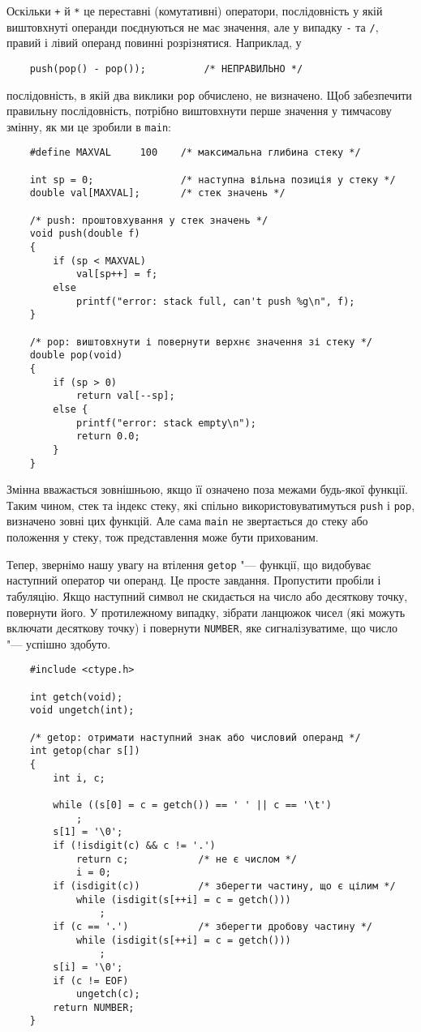\documentclass[a4paper,12pt]{book}
\begin{document}
  Оскільки \texttt{+} й \texttt{*} це переставні (комутативні) оператори, послідовність у
  якій виштовхнуті операнди поєднуються не має значення, але у випадку \texttt{-} та
  \texttt{/}, правий і лівий операнд повинні розрізнятися. Наприклад, у
  \begin{verbatim}
    push(pop() - pop());          /* НЕПРАВИЛЬНО */
  \end{verbatim}
  послідовність, в якій два виклики \texttt{pop} обчислено, не визначено. Щоб забезпечити
  правильну послідовність, потрібно виштовхнути перше значення у тимчасову змінну, як ми
  це зробили в \texttt{main}:
      \begin{verbatim}
    #define MAXVAL     100    /* максимальна глибина стеку */

    int sp = 0;               /* наступна вільна позиція у стеку */
    double val[MAXVAL];       /* стек значень */

    /* push: проштовхування у стек значень */
    void push(double f)
    {
        if (sp < MAXVAL)
            val[sp++] = f;
        else
            printf("error: stack full, can't push %g\n", f);
    }

    /* pop: виштовхнути і повернути верхнє значення зі стеку */
    double pop(void)
    {
        if (sp > 0)
            return val[--sp];
        else {
            printf("error: stack empty\n");
            return 0.0;
        }
    }
  \end{verbatim}

  Змінна вважається зовнішньою, якщо її означено поза межами будь-якої функції. Таким
  чином, стек та індекс стеку, які спільно використовуватимуться \texttt{push} і
  \texttt{pop}, визначено зовні цих функцій. Але сама \texttt{main} не звертається до
  стеку або положення у стеку, тож представлення може бути прихованим.

  Тепер, звернімо нашу увагу на втілення \texttt{getop} "--- функції, що видобуває
  наступний оператор чи операнд. Це просте завдання. Пропустити пробіли і табуляцію. Якщо
  наступний символ не скидається на число або десяткову точку, повернути його. У
  протилежному випадку, зібрати ланцюжок чисел (які можуть включати десяткову точку) і
  повернути \texttt{NUMBER}, яке сигналізуватиме, що число "--- успішно здобуто.
  \begin{verbatim}
    #include <ctype.h>

    int getch(void);
    void ungetch(int);

    /* getop: отримати наступний знак або числовий операнд */
    int getop(char s[])
    {
        int i, c;

        while ((s[0] = c = getch()) == ' ' || c == '\t')
            ;
        s[1] = '\0';
        if (!isdigit(c) && c != '.')
            return c;            /* не є числом */
            i = 0;
        if (isdigit(c))          /* зберегти частину, що є цілим */
            while (isdigit(s[++i] = c = getch()))
                ;
        if (c == '.')            /* зберегти дробову частину */
            while (isdigit(s[++i] = c = getch()))
                ;
        s[i] = '\0';
        if (c != EOF)
            ungetch(c);
        return NUMBER;
    }
  \end{verbatim}
\end{document}
